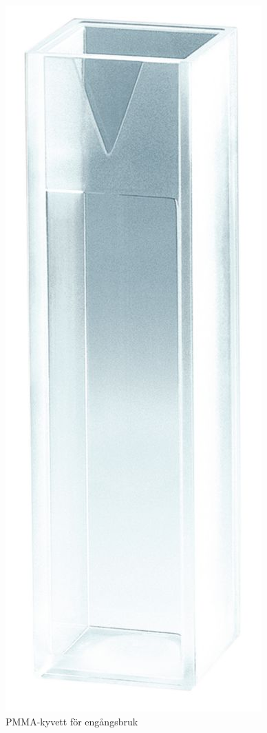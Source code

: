 \documentclass[./chem_exercises.tex]{subfiles}
\begin{document}
\begin{figure}[H]
\begin{center}
  \includegraphics[scale=0.1]{PMMA_kyvett.jpg}
  \caption{PMMA-kyvett för engångsbruk}
  \end{center}
  \label{fig4}
\end{figure}
\end{document}
